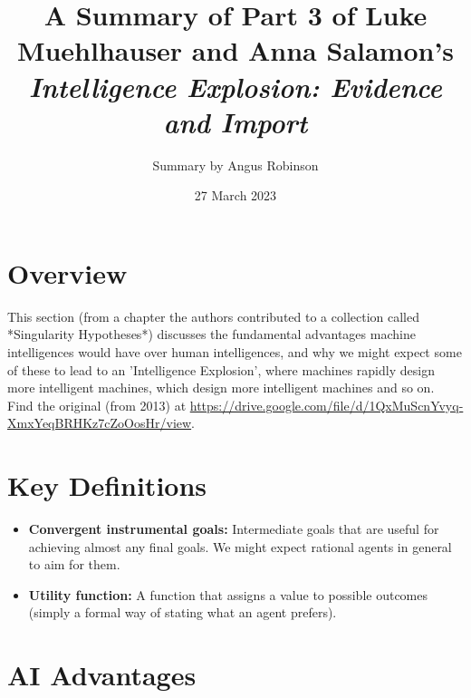 \documentclass{article}
\title{A Summary of Part 3 of Luke Muehlhauser and Anna Salamon's \textit{Intelligence Explosion: Evidence and Import}}
\author{Summary by Angus Robinson}
\date{27 March 2023}
\begin{document}

\maketitle
\begin{multicols}{2}

\section{Overview}

This section (from a chapter the authors contributed to a collection called *Singularity Hypotheses*) discusses the fundamental advantages machine intelligences would have over human intelligences, and why we might expect some of these to lead to an 'Intelligence Explosion', where machines rapidly design more intelligent machines, which design more intelligent machines and so on. \\ Find the original (from 2013) at \href{https://drive.google.com/file/d/1QxMuScnYvyq-XmxYeqBRHKz7cZoOosHr/view}{https://drive.google.com/file/d/1QxMuScnYvyq-XmxYeqBRHKz7cZoOosHr/view}.

\section{Key Definitions}

\begin{itemize}
\item \textbf{Convergent instrumental goals:}  Intermediate goals that are useful for achieving almost any final goals. We might expect rational agents in general to aim for them.
\item \textbf{Utility function:} A function that assigns a value to possible outcomes (simply a formal way of stating what an agent prefers).
\end{itemize}


\section{AI Advantages}


\end{multicols}
\end{document}
